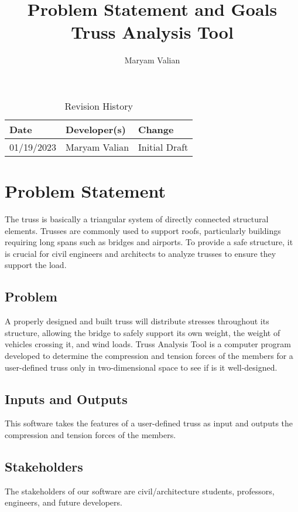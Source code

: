 \documentclass{article}
\title{Problem Statement and Goals\\Truss Analysis Tool}
\author{Maryam Valian}
\date{}
\begin{document}
\maketitle

\begin{table}[hp]
\caption{Revision History} \label{TblRevisionHistory}
\begin{tabularx}{\textwidth}{llX}
\toprule
\textbf{Date} & \textbf{Developer(s)} & \textbf{Change}\\
\midrule
01/19/2023 & Maryam Valian & Initial Draft\\

\bottomrule
\end{tabularx}
\end{table}

\section{Problem Statement}

The truss is basically a triangular system of directly connected structural elements. Trusses are commonly used to support roofs, particularly buildings requiring long spans
such as bridges and airports. To provide a safe structure, it is crucial for civil engineers and
architects to analyze trusses to ensure they support the load.


\subsection{Problem}
A properly designed and built truss will distribute stresses throughout its structure, allowing the bridge to safely support its own weight, the weight of vehicles crossing it, and wind loads. Truss Analysis Tool is a computer program developed to determine the compression and tension forces of the members for a user-defined  truss only in two-dimensional space to see if is it well-designed.

\subsection{Inputs and Outputs}

This software takes the features of a user-defined truss as input and outputs the compression and tension forces of the members.


\subsection{Stakeholders}
The stakeholders of our software are civil/architecture students, professors, engineers, and future developers.
\end{document}
